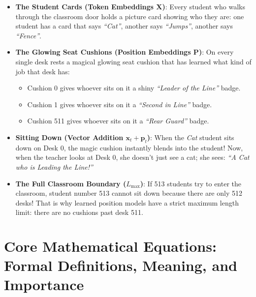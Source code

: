 \documentclass[11pt,a4paper]{article}
\theoremstyle{definition}
\begin{document}
\begin{itemize}
    \item \textbf{The Student Cards (Token Embeddings $\mathbf{X}$)}:
    Every student who walks through the classroom door holds a picture card showing who they are: one student has a card that says \emph{``Cat''}, another says \emph{``Jumps''}, another says \emph{``Fence''}.
    
    \item \textbf{The Glowing Seat Cushions (Position Embeddings $\mathbf{P}$)}:
    On every single desk rests a magical glowing seat cushion that has learned what kind of job that desk has:
    \begin{itemize}
        \item Cushion 0 gives whoever sits on it a shiny \emph{``Leader of the Line''} badge.
        \item Cushion 1 gives whoever sits on it a \emph{``Second in Line''} badge.
        \item Cushion 511 gives whoever sits on it a \emph{``Rear Guard''} badge.
    \end{itemize}
    
    \item \textbf{Sitting Down (Vector Addition $\mathbf{x}_t + \mathbf{p}_t$)}:
    When the \emph{Cat} student sits down on Desk 0, the magic cushion instantly blends into the student! Now, when the teacher looks at Desk 0, she doesn't just see a cat; she sees: \emph{``A Cat who is Leading the Line!''}
    
    \item \textbf{The Full Classroom Boundary ($L_{\text{max}}$)}:
    If 513 students try to enter the classroom, student number 513 cannot sit down because there are only 512 desks! That is why learned position models have a strict maximum length limit: there are no cushions past desk 511.
\end{itemize}

\section{Core Mathematical Equations: Formal Definitions, Meaning, and Importance}
\end{document}
